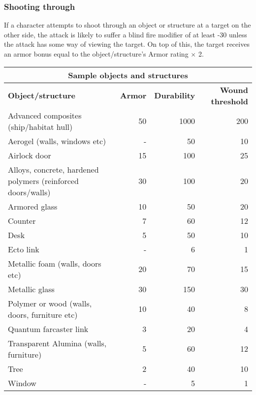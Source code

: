 \subsubsection{Shooting through}

If a character attempts to shoot through an object or structure at a target on the other side, the attack is likely to suffer a blind fire modifier of at least -30 unless the attack has some way of viewing the target. On top of this, the target receives an armor bonus equal to the object/structure’s Armor rating $\times$ 2.

\begin{table}
\begin{tabularx}{\textwidth}{|X|r|r|r|}
\hline
\multicolumn{4}{|c|}{\textbf{Sample objects and structures}} \\
\hline
\textbf{Object/structure} & \textbf{Armor} & \textbf{Durability} & \textbf{Wound threshold}	\\
\hline
Advanced composites (ship/habitat hull)						& 50	& 1000	& 200		\\
\hline
Aerogel (walls, windows etc)								& -	& 50		& 10			\\
\hline
Airlock door											& 15	& 100	& 25			\\
\hline
Alloys, concrete, hardened polymers (reinforced doors/walls)	& 30	& 100	& 20			\\
\hline
Armored glass											& 10	& 50		& 20			\\
\hline
Counter												& 7	& 60		& 12			\\
\hline
Desk													& 5	& 50		& 10			\\
\hline
Ecto link												& -	& 6		& 1			\\
\hline
Metallic foam (walls, doors etc)							& 20	& 70		& 15			\\
\hline
Metallic glass											& 30	& 150	& 30			\\
\hline
Polymer or wood (walls, doors, furniture etc)				& 10	& 40		& 8			\\
\hline
Quantum farcaster link									& 3	& 20		& 4			\\
\hline
Transparent Alumina (walls, furniture)						& 5	& 60		& 12			\\
\hline
Tree													& 2	& 40		& 10			\\
\hline
Window												& -	& 5		& 1			\\
\hline
\end{tabularx}
\label{tab:sample-objects-structures}
\end{table}

